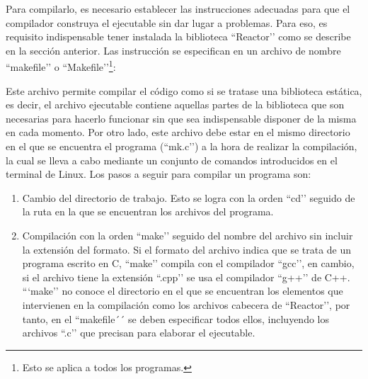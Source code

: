 Para compilarlo, es necesario establecer las instrucciones adecuadas para que el compilador construya el ejecutable sin dar lugar a problemas. Para eso, es requisito indispensable tener instalada la biblioteca ``Reactor’’ como se describe en la sección anterior. Las instrucción se especifican en un archivo de nombre ``makefile’’ o ``Makefile’’\footnote{Esto se aplica a todos los programas.}:


Este archivo permite compilar el código como si se tratase una biblioteca estática, es decir, el archivo ejecutable contiene aquellas partes de la biblioteca que son necesarias para hacerlo funcionar sin que sea indispensable disponer de la misma en cada momento. 
Por otro lado, este archivo debe estar en el mismo directorio en el que se encuentra el programa (``mk.c’’) a la hora de realizar la compilación, la cual se lleva a cabo mediante un conjunto de comandos introducidos en el terminal de Linux. Los pasos a seguir para compilar un programa son:

\begin{enumerate}
    \item Cambio del directorio de trabajo. Esto se logra con la orden ``cd’’ seguido de la ruta en la que se encuentran los archivos del programa.
    \item Compilación con la orden ``make’’ seguido del nombre del archivo sin incluir la extensión del formato. Si el formato del archivo indica que se trata de un programa escrito en C, ``make’’ compila con el compilador ``gcc’’, en cambio, si el archivo tiene la extensión ``.cpp’’ se usa el compilador ``g++’’ de C++.
    ```make’’ no conoce el directorio en el que se encuentran los elementos que intervienen en la compilación como los archivos cabecera de ``Reactor’’, por tanto, en el ``makefile´´ se deben especificar todos ellos, incluyendo los archivos ``.c’’ que precisan para elaborar el ejecutable.
\end{enumerate}

